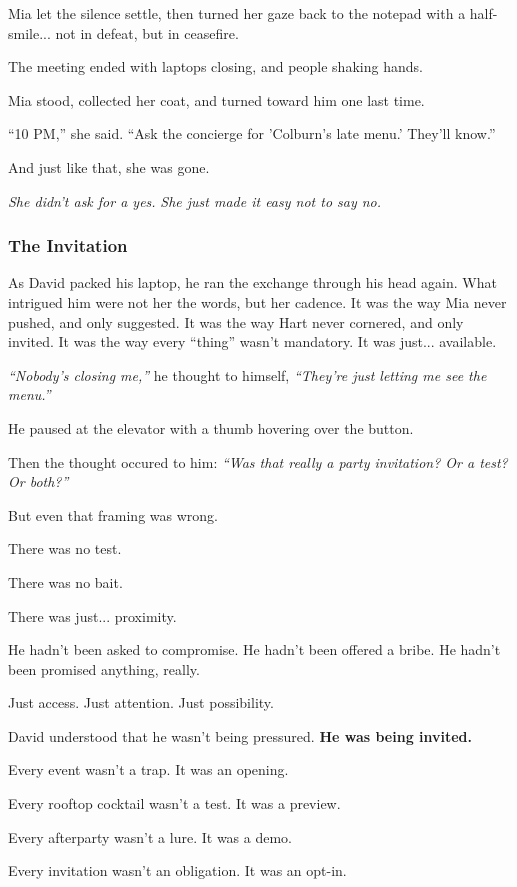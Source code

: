 Mia let the silence settle, then turned her gaze back to the notepad with a half-smile... not in defeat, but in ceasefire.

The meeting ended with laptops closing, and people shaking hands.

Mia stood, collected her coat, and turned toward him one last time.

``10 PM,'' she said. ``Ask the concierge for 'Colburn’s late menu.' They'll know.''

And just like that, she was gone.

\textit{She didn’t ask for a yes.}
\textit{She just made it easy not to say no.}

\subsubsection{The Invitation}

As David packed his laptop, he ran the exchange through his head again. What intrigued him were not her the words, 
but her cadence. It was the way Mia never pushed, and only suggested. It was the way Hart never cornered, and only 
invited. It was the way every ``thing'' wasn’t mandatory. It was just... available.

\textit{``Nobody’s closing me,''} he thought to himself, \textit{``They’re just letting me see the menu.''}

He paused at the elevator with a thumb hovering over the button.

Then the thought occured to him: \textit{``Was that really a party invitation? Or a test? Or both?''}

But even that framing was wrong.

There was no test.

There was no bait.

There was just... proximity.

He hadn’t been asked to compromise.
He hadn’t been offered a bribe.
He hadn’t been promised anything, really.

Just access.
Just attention.
Just possibility.


David understood that he wasn't being pressured. \textbf{He was being invited.}

Every event wasn’t a trap. It was an opening.

Every rooftop cocktail wasn’t a test. It was a preview.  

Every afterparty wasn’t a lure. It was a demo.  

Every invitation wasn’t an obligation. It was an opt-in.

